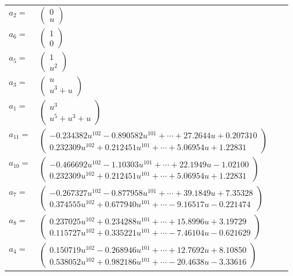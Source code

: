 \documentclass[1p]{elsarticle_modified}
\theoremstyle{definition}
\begin{document}
\begin{tabular}{m{7pt} m{180pt} m{7pt} m{180pt} }
\flushright $a_{2}=$&$\begin{pmatrix}0\\u\end{pmatrix}$ \\
\flushright $a_{6}=$&$\begin{pmatrix}1\\0\end{pmatrix}$ \\
\flushright $a_{5}=$&$\begin{pmatrix}1\\u^2\end{pmatrix}$ \\
\flushright $a_{3}=$&$\begin{pmatrix}u\\u^3+u\end{pmatrix}$ \\
\flushright $a_{1}=$&$\begin{pmatrix}u^3\\u^5+u^3+u\end{pmatrix}$ \\
\flushright $a_{11}=$&$\begin{pmatrix}-0.234382 u^{102}-0.890582 u^{101}+\cdots+27.2644 u+0.207310\\0.232309 u^{102}+0.212451 u^{101}+\cdots+5.06954 u+1.22831\end{pmatrix}$ \\
\flushright $a_{10}=$&$\begin{pmatrix}-0.466692 u^{102}-1.10303 u^{101}+\cdots+22.1949 u-1.02100\\0.232309 u^{102}+0.212451 u^{101}+\cdots+5.06954 u+1.22831\end{pmatrix}$ \\
\flushright $a_{7}=$&$\begin{pmatrix}-0.267327 u^{102}-0.877958 u^{101}+\cdots+39.1849 u+7.35328\\0.374555 u^{102}+0.677940 u^{101}+\cdots-9.16517 u-0.221474\end{pmatrix}$ \\
\flushright $a_{8}=$&$\begin{pmatrix}0.237025 u^{102}+0.234288 u^{101}+\cdots+15.8996 u+3.19729\\0.115727 u^{102}+0.335221 u^{101}+\cdots-7.46104 u-0.621629\end{pmatrix}$ \\
\flushright $a_{4}=$&$\begin{pmatrix}0.150719 u^{102}-0.268946 u^{101}+\cdots+12.7692 u+8.10850\\0.538052 u^{102}+0.982186 u^{101}+\cdots-20.4638 u-3.33616\end{pmatrix}$ \\

\end{tabular}
\end{document}
